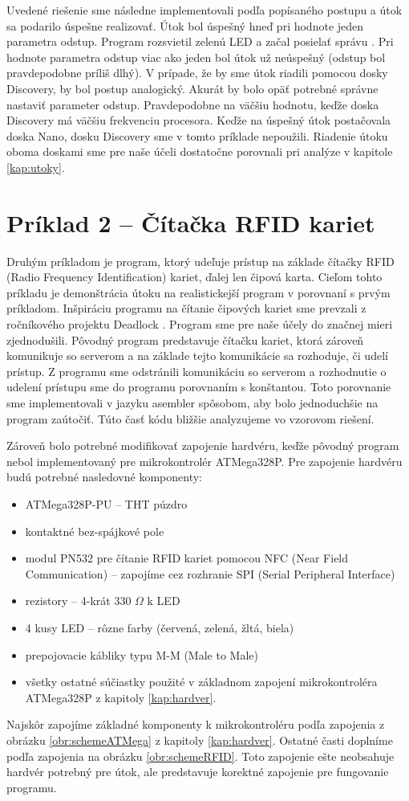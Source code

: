 Uvedené riešenie sme následne implementovali podľa popísaného postupu a útok sa podarilo úspešne realizovať. Útok bol úspešný hneď pri hodnote jeden parametra odstup. Program rozsvietil zelenú LED a začal posielať správu . Pri hodnote parametra odstup viac ako jeden bol útok už neúspešný (odstup bol pravdepodobne príliš dlhý). V prípade, že by sme útok riadili pomocou dosky Discovery, by bol postup analogický. Akurát by bolo opäť potrebné správne nastaviť parameter odstup. Pravdepodobne na väčšiu hodnotu, keďže doska Discovery má väčšiu frekvenciu procesora. Keďže na úspešný útok postačovala doska Nano, dosku Discovery sme v tomto príklade nepoužili. Riadenie útoku oboma doskami sme pre naše účeli dostatočne porovnali pri analýze v kapitole \ref{kap:utoky}.

\section{Príklad 2 -- Čítačka RFID kariet}
Druhým príkladom je program, ktorý udeľuje prístup na základe čítačky RFID (Radio Frequency Identification) kariet, ďalej len čipová karta. Cieľom tohto príkladu je demonštrácia útoku na realistickejší program v porovnaní s prvým príkladom. Inšpiráciu programu na čítanie čipových kariet sme prevzali z ročníkového projektu Deadlock \cite{deadlock}. Program sme pre naše účely do značnej mieri zjednodušili. Pôvodný program predstavuje čítačku kariet, ktorá zároveň komunikuje so serverom a na základe tejto komunikácie sa rozhoduje, či udelí prístup. Z programu sme odstránili komunikáciu so serverom a rozhodnutie o udelení prístupu sme  do programu porovnaním s konštantou. Toto porovnanie sme implementovali v jazyku asembler spôsobom, aby bolo jednoduchšie na program zaútočiť. Túto časť kódu bližšie analyzujeme vo vzorovom riešení.

Zároveň bolo potrebné modifikovať zapojenie hardvéru, keďže pôvodný program nebol implementovaný pre mikrokontrolér ATMega328P. Pre zapojenie hardvéru budú potrebné nasledovné komponenty:
\begin{itemize}
    \item ATMega328P-PU -- THT púzdro
    \item kontaktné bez-spájkové pole
    \item modul PN532 pre čítanie RFID kariet pomocou NFC (Near Field Communication) -- zapojíme cez rozhranie SPI (Serial Peripheral Interface)
    \item rezistory -- 4-krát 330 $\Omega$ k LED
    \item 4 kusy LED -- rôzne farby (červená, zelená, žltá, biela)
    \item prepojovacie kábliky typu M-M (Male to Male)
    \item všetky ostatné súčiastky použité v základnom zapojení mikrokontroléra ATMega328P z kapitoly \ref{kap:hardver}.
\end{itemize}
Najskôr zapojíme základné komponenty k mikrokontroléru podľa zapojenia z obrázku \ref{obr:schemeATMega} z kapitoly \ref{kap:hardver}. Ostatné časti doplníme podľa zapojenia na obrázku \ref{obr:schemeRFID}. Toto zapojenie ešte neobsahuje hardvér potrebný pre útok, ale predstavuje korektné zapojenie pre fungovanie programu.

